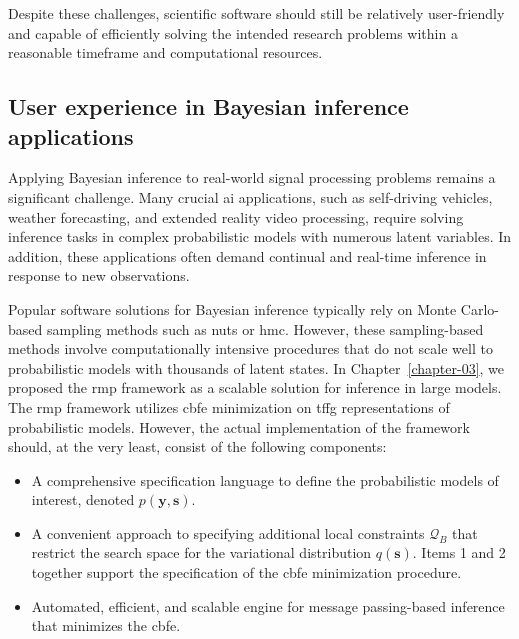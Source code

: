 Despite these challenges, scientific software should still be relatively user-friendly and
capable of efficiently solving the intended research problems within a reasonable timeframe
and computational resources.


\subsection*{User experience in Bayesian inference applications}

Applying Bayesian inference to real-world signal processing problems remains a significant
challenge.
Many crucial \ac{ai} applications, such as self-driving vehicles, weather forecasting, and extended
reality video processing, require solving inference tasks in complex probabilistic models with
numerous latent variables.
In addition, these applications often demand continual and real-time inference in response to
new observations.

Popular software solutions for Bayesian inference typically rely on Monte Carlo-based sampling
methods such as \ac{nuts} or \ac{hmc}.
However, these sampling-based methods involve computationally intensive procedures that do not
scale well to probabilistic models with thousands of latent states.
In Chapter~\ref{chapter-03}, we proposed the \ac{rmp} framework as a
scalable solution for inference in large models.
The \ac{rmp} framework utilizes \ac{cbfe} minimization on \ac{tffg} representations of probabilistic models.
However, the actual implementation of the framework should, at the very least, consist of the
following components:

\begin{itemize}
  \item A comprehensive specification language to define the probabilistic models of interest, denoted $p(\bm{y}, \bm{s})$.
  \item A convenient approach to specifying additional local constraints $\mathcal{Q}_{B}$ that restrict the search space for the variational distribution $q(\bm{s})$.
        Items 1 and 2 together support the specification of the \ac{cbfe} minimization procedure.
  \item Automated, efficient, and scalable engine for message passing-based inference that minimizes the \ac{cbfe}.
\end{itemize}

